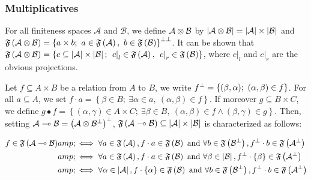 \subsubsection{Multiplicatives}\label{multiplicatives}

For all finiteness spaces \({\mathcal A}\) and \({\mathcal B}\), we
define \({\mathcal A} \otimes {\mathcal B}\) by
\(\left|{\mathcal A} \otimes {\mathcal B}\right| = \left|\mathcal A\right| \times \left|\mathcal B\right|\)
and
\(\mathfrak F\left({\mathcal A} \tens {\mathcal B}\right) = \left\{a\times b;\ a\in \mathfrak F\left(\mathcal A\right),\ b\in\mathfrak F\left(\mathcal B\right)\right\}\biorth\).
It can be shown that
\(\mathfrak F\left({\mathcal A} \otimes {\mathcal B}\right) = \left\{ c \subseteq \left|\mathcal A\right|\times\left|\mathcal B\right|;\  \left.c\right|_l\in \mathfrak F\left(\mathcal A\right),\ \left.c\right|_r\in\mathfrak F\left(\mathcal B\right)\right\}\),
where \(\left.c\right|_l\) and \(\left.c\right|_r\) are the obvious
projections.

Let \(f\subseteq A \times B\) be a relation from \(A\) to \(B\), we
write \(f^\bot=\left\{(\beta,\alpha);\  (\alpha,\beta)\in f\right\}\).
For all \(a\subseteq A\), we set
\(f\cdot a = \left\{\beta\in B;\  \exists \alpha\in a,\ (\alpha,\beta)\in f\right\}\).
If moreover \(g\subseteq B \times C\), we define
\(g \bullet f = \left\{(\alpha,\gamma)\in A\times C;\  \exists \beta\in B,\ (\alpha,\beta)\in f\wedge(\beta,\gamma)\in g\right\}\).
Then, setting
\({\mathcal A}\multimap{\mathcal B} = \left({\mathcal A}\otimes {\mathcal B}^\bot\right)^\bot\),
\(\mathfrak F\left({\mathcal A}\multimap{\mathcal B}\right)\subseteq {\left|\mathcal A\right|\times\left|\mathcal B\right|}\)
is characterized as follows:

\begin{align}
        f\in \mathfrak F\left({\mathcal A}\multimap{\mathcal B}\right) &amp;\iff \forall a\in \mathfrak F\left({\mathcal A}\right), f\cdot a \in\mathfrak F\left({\mathcal B}\right) \text{ and } \forall b\in \mathfrak F\left({\mathcal B}^\bot\right), f^\bot\cdot b \in\mathfrak F\left({\mathcal A}^\bot\right)
        \\
        &amp;\iff \forall a\in \mathfrak F\left({\mathcal A}\right), f\cdot a \in\mathfrak F\left({\mathcal B}\right) \text{ and } \forall \beta\in \left|{\mathcal B}\right|, f^\bot\cdot \left\{\beta\right\} \in\mathfrak F\left({\mathcal A}^\bot\right)
        \\
        &amp;\iff \forall \alpha\in \left|{\mathcal A}\right|, f\cdot \left\{\alpha\right\} \in\mathfrak F\left({\mathcal B}\right) \text{ and } \forall b\in \mathfrak F\left({\mathcal B}^\bot\right), f^\bot\cdot b \in\mathfrak F\left({\mathcal A}^\bot\right)
\end{align}

